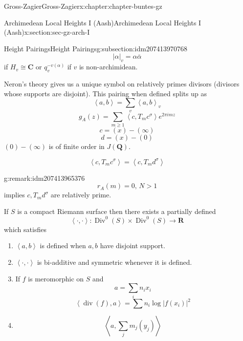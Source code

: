 \documentclass[oneside,10pt,]{book}
\numberwithin{equation}{section}
\newcommand{\pair}[2]{\left\langle #1, #2 \right\rangle}
\newcommand{\QQ}{\mathbf{Q}}
\newcommand{\RR}{\mathbf{R}}
\newcommand{\CC}{\mathbf{C}}
\DeclareMathOperator{\divisor}{div}
\DeclareMathOperator{\Div}{Div}
\newcommand{\gt}{>}
\begin{document}
\begin{chapterptx}{Gross-Zagier}{}{Gross-Zagier}{}{}{x:chapter:chapter-buntes-gz}
\begin{sectionptx}{Archimedean Local Heights I (Aash)}{}{Archimedean Local Heights I (Aash)}{}{}{x:section:sec-gz-arch-I}
\begin{subsectionptx}{Height Pairings}{}{Height Pairings}{}{}{g:subsection:idm207413970768}
\begin{equation*}
|\alpha |_v = \alpha \bar \alpha
\end{equation*}
if \(H_v \cong \CC\) or \(q_v^{-v(\alpha )}\) if \(v\) is non-archimidean.%
\par
Neron's theory gives us a unique symbol on relatively primes divisors (divisors whose supports are disjoint). This pairing when defined splits up as%
\begin{equation*}
\pair ab = \sum_v \pair ab_v
\end{equation*}
%
\begin{equation*}
g_A(z) = \sum_{m\ge1} \pair c{ T_m c^\sigma } e^{2\pi  i m z}
\end{equation*}
%
\begin{equation*}
c=(x) - (\infty )
\end{equation*}
%
\begin{equation*}
d = (x) - (0)
\end{equation*}
\((0)-(\infty )\) is of finite order in \(J(\QQ)\).%
\par
%
\begin{equation*}
\pair c{T_m c^\sigma } = \pair c {T_m d^\sigma }
\end{equation*}
%
\begin{remark}{}{g:remark:idm207413965376}%
%
\begin{equation*}
r_A(m) = 0,\, N \gt1
\end{equation*}
implies \(c,T_m d^\sigma\)  are relatively prime.%
\end{remark}
If \(S\) is a compact Riemann surface then there exists a partially defined%
\begin{equation*}
\pair \cdot \cdot \colon  \Div^0(S) \times \Div^0(S) \to \RR
\end{equation*}
which satisfies%
\begin{enumerate}
\item{}\(\pair ab\) is defined when \(a,b\) have disjoint support.%
\item{}\(\pair \cdot\cdot\) is bi-additive and symmetric whenever it is defined.%
\item{}If \(f\) is meromorphic on \(S\) and%
\begin{equation*}
a= \sum_i n_i x_i
\end{equation*}
%
\begin{equation*}
\pair{\divisor (f)} a = \sum n_i \log|f(x_i)|^2
\end{equation*}
%
\item{}%
\begin{equation*}
\pair a {\sum_j m_j (y_j)}

\end{equation*}
\end{enumerate}
\end{subsectionptx}
\end{sectionptx}
\end{chapterptx}
\end{document}
